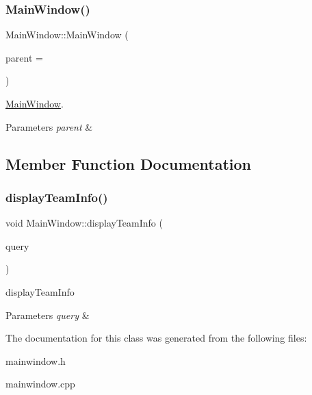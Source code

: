 \subsubsection{\texorpdfstring{Main\+Window()}{MainWindow()}}
{\footnotesize\ttfamily Main\+Window\+::\+Main\+Window (\begin{DoxyParamCaption}\item[{Q\+Widget $\ast$}]{parent = {} }\end{DoxyParamCaption})\hspace{0.3cm}{\ttfamily [explicit]}}



\hyperlink{class_main_window}{Main\+Window}. 


\begin{DoxyParams}{Parameters}
{\em parent} & \\
\hline
\end{DoxyParams}


\subsection{Member Function Documentation}
\mbox{\label{class_main_window_a65071d7a414765292d760181c3d72eff}} 
\subsubsection{\texorpdfstring{display\+Team\+Info()}{displayTeamInfo()}}
{\footnotesize\ttfamily void Main\+Window\+::display\+Team\+Info (\begin{DoxyParamCaption}\item[{Q\+Sql\+Query}]{query }\end{DoxyParamCaption})}



display\+Team\+Info 


\begin{DoxyParams}{Parameters}
{\em query} & \\
\hline
\end{DoxyParams}


The documentation for this class was generated from the following files\+:\begin{DoxyCompactItemize}
\item 
mainwindow.\+h\item 
mainwindow.\+cpp\end{DoxyCompactItemize}
